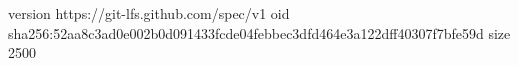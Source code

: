 version https://git-lfs.github.com/spec/v1
oid sha256:52aa8c3ad0e002b0d091433fcde04febbec3dfd464e3a122dff40307f7bfe59d
size 2500
